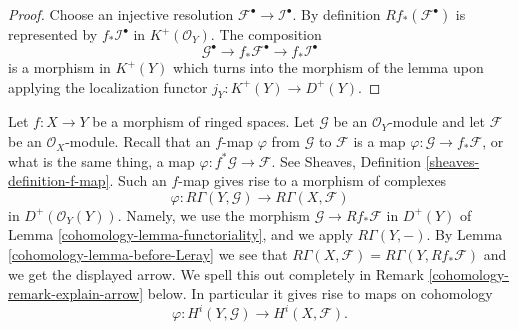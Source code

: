 \begin{proof}
Choose an injective resolution $\mathcal{F}^\bullet \to \mathcal{I}^\bullet$.
By definition $Rf_*(\mathcal{F}^\bullet)$ is represented by
$f_*\mathcal{I}^\bullet$ in $K^{+}(\mathcal{O}_Y)$.
The composition
$$
\mathcal{G}^\bullet \to f_*\mathcal{F}^\bullet \to f_*\mathcal{I}^\bullet
$$
is a morphism in $K^{+}(Y)$ which turns
into the morphism of the lemma upon applying the
localization functor $j_Y : K^{+}(Y) \to D^{+}(Y)$.
\end{proof}

Let $f : X \to Y$ be a morphism of ringed spaces.
Let $\mathcal{G}$ be an $\mathcal{O}_Y$-module and let
$\mathcal{F}$ be an $\mathcal{O}_X$-module. Recall that an
$f$-map $\varphi$ from $\mathcal{G}$ to $\mathcal{F}$ is a map
$\varphi : \mathcal{G} \to f_*\mathcal{F}$, or what is the same
thing, a map $\varphi : f^*\mathcal{G} \to \mathcal{F}$.
See Sheaves, Definition \ref{sheaves-definition-f-map}.
Such an $f$-map gives rise to a morphism of complexes
\begin{equation}
\label{equation-functorial-derived}
\varphi :
R\Gamma(Y, \mathcal{G})
\longrightarrow
R\Gamma(X, \mathcal{F})
\end{equation}
in $D^{+}(\mathcal{O}_Y(Y))$. Namely, we use the morphism
$\mathcal{G} \to Rf_*\mathcal{F}$ in $D^{+}(Y)$ of
Lemma \ref{cohomology-lemma-functoriality}, and we apply $R\Gamma(Y, -)$.
By Lemma \ref{cohomology-lemma-before-Leray} we see that
$R\Gamma(X, \mathcal{F}) = R\Gamma(Y, Rf_*\mathcal{F})$
and we get the displayed arrow. We spell this out completely in
Remark \ref{cohomology-remark-explain-arrow} below.
In particular it gives
rise to maps on cohomology
\begin{equation}
\label{equation-functorial}
\varphi : H^i(Y, \mathcal{G}) \longrightarrow H^i(X, \mathcal{F}).
\end{equation}

